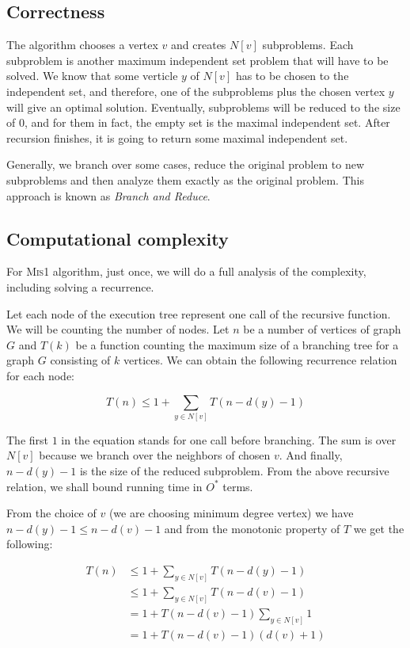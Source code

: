 \subsection{Correctness}

The algorithm chooses a vertex $v$ and creates $N[v]$ subproblems. Each subproblem is another maximum independent set problem that will have to be solved. We know that some verticle $y$ of $N[v]$ has to be chosen to the independent set, and therefore, one of the subproblems plus the chosen vertex $y$ will give an optimal solution. Eventually, subproblems will be reduced to the size of $0$, and for them in fact, the empty set is the maximal independent set. After recursion finishes, it is going to return some maximal independent set.

Generally, we branch over some cases, reduce the original problem to new subproblems and then analyze them exactly as the original problem. This approach is known as \emph{Branch and Reduce}. 

\subsection{Computational complexity}

For \textsc{Mis1} algorithm, just once, we will do a full analysis of the complexity, including solving a recurrence. 

Let each node of the execution tree represent one call of the recursive function. We will be counting the number of nodes. Let $n$ be a number of vertices of graph $G$ and $T(k)$ be a function counting the maximum size of a branching tree for a graph $G$ consisting of $k$ vertices. We can obtain the following recurrence relation for each node:

$$
T(n) \leq 1 + \sum_{y\in N[v]} T(n - d(y) - 1)
$$

The first $1$ in the equation stands for one call before branching. The sum is over $N[v]$ because we branch over the neighbors of chosen $v$. And finally, $n - d(y) - 1$ is the size of the reduced subproblem. From the above recursive relation, we shall bound running time in $O^*$ terms.

From the choice of $v$ (we are choosing minimum degree vertex) we have $n-d(y)-1 \leq n - d(v) -1$ and from the monotonic property of $T$ we get the following:

\begin{equation*}
\begin{split}
T(n) & \leq 1 + \sum_{y\in N[v]} T(n - d(y) - 1) \\
 & \leq  1 + \sum_{y\in N[v]} T(n - d(v) - 1) \\
 & = 1 + T(n - d(v) - 1) \sum_{y\in N[v]} 1 \\
 & = 1 + T(n - d(v) - 1)(d(v) + 1)
\end{split}
\end{equation*}

